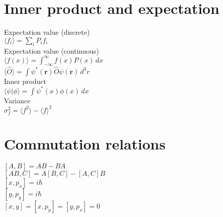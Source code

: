 \documentclass[12pt,a4paper]{article}
\begin{document}
\section*{Inner product and expectation}
\begin{center}
	Expectation value (discrete) \\[.15in]
	\(\langle f_i \rangle = \sum_{i} P_i f_i\) \\[.25in]
	Expectation value (continuous) \\[.15in]
	\(\langle f(x) \rangle = \int_{-\infty}^{\infty} f(x) P(x) \, dx\) \\[.15in]
	\(\langle \hat{O} \rangle = \int \psi^*(\mathbf{r}) \hat{O} \psi(\mathbf{r}) \, d^3r\) \\[.25in]
	Inner product \\[.15in]
	\(\langle \psi | \phi \rangle = \int \psi^*(x) \phi(x) \, dx\) \\[.25in]
	Variance \\[.15in]
	\(\sigma_f^2 = \langle f^2 \rangle - \langle f \rangle^2\)
\end{center}

\section*{Commutation relations}
\begin{center}
	$[A, B] = AB - BA$\\
	$[AB, C] = A[B, C] - [A, C]B$\\
	$[x, p_x] = i\hbar$\\
	$[y, p_y] = i\hbar$\\
	$[x, y] = [x, p_y] = [y, p_x] = 0$\\
\end{center}
\end{document}
